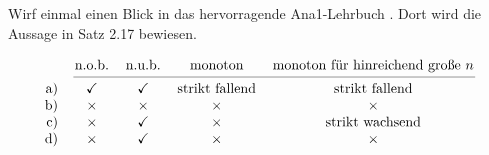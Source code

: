 \begin{loes}
    Wirf einmal einen Blick in das hervorragende Ana1-Lehrbuch \cite{AE06}. Dort wird die Aussage in Satz 2.17 bewiesen.
\end{loes}


\begin{loes} \quad
    \[ \begin{tabular}{rcccc}
        & n.o.b. &n.u.b. & monoton & monoton für hinreichend große $n$ \\
        \cmidrule(lr){2-5}
        a) & \checkmark & \checkmark & strikt fallend & strikt fallend \\
        b) & $\times$ & $\times$ & $\times$ & $\times$ \\
        c) & $\times$ & \checkmark & $\times$ & strikt wachsend \\
        d) & $\times$ & \checkmark & $\times$ & $\times$
    \end{tabular} \]
\end{loes}

